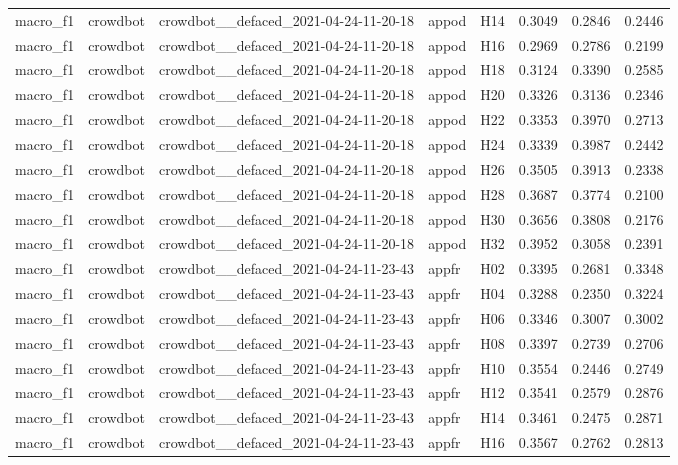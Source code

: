 \begin{table}[tbp]
\begin{tabular}{lllllrrr}
macro\_f1 & crowdbot & crowdbot\_\_defaced\_2021-04-24-11-20-18 & appod & H14 & 0.3049 & 0.2846 & 0.2446 \\
macro\_f1 & crowdbot & crowdbot\_\_defaced\_2021-04-24-11-20-18 & appod & H16 & 0.2969 & 0.2786 & 0.2199 \\
macro\_f1 & crowdbot & crowdbot\_\_defaced\_2021-04-24-11-20-18 & appod & H18 & 0.3124 & 0.3390 & 0.2585 \\
macro\_f1 & crowdbot & crowdbot\_\_defaced\_2021-04-24-11-20-18 & appod & H20 & 0.3326 & 0.3136 & 0.2346 \\
macro\_f1 & crowdbot & crowdbot\_\_defaced\_2021-04-24-11-20-18 & appod & H22 & 0.3353 & 0.3970 & 0.2713 \\
macro\_f1 & crowdbot & crowdbot\_\_defaced\_2021-04-24-11-20-18 & appod & H24 & 0.3339 & 0.3987 & 0.2442 \\
macro\_f1 & crowdbot & crowdbot\_\_defaced\_2021-04-24-11-20-18 & appod & H26 & 0.3505 & 0.3913 & 0.2338 \\
macro\_f1 & crowdbot & crowdbot\_\_defaced\_2021-04-24-11-20-18 & appod & H28 & 0.3687 & 0.3774 & 0.2100 \\
macro\_f1 & crowdbot & crowdbot\_\_defaced\_2021-04-24-11-20-18 & appod & H30 & 0.3656 & 0.3808 & 0.2176 \\
macro\_f1 & crowdbot & crowdbot\_\_defaced\_2021-04-24-11-20-18 & appod & H32 & 0.3952 & 0.3058 & 0.2391 \\
macro\_f1 & crowdbot & crowdbot\_\_defaced\_2021-04-24-11-23-43 & appfr & H02 & 0.3395 & 0.2681 & 0.3348 \\
macro\_f1 & crowdbot & crowdbot\_\_defaced\_2021-04-24-11-23-43 & appfr & H04 & 0.3288 & 0.2350 & 0.3224 \\
macro\_f1 & crowdbot & crowdbot\_\_defaced\_2021-04-24-11-23-43 & appfr & H06 & 0.3346 & 0.3007 & 0.3002 \\
macro\_f1 & crowdbot & crowdbot\_\_defaced\_2021-04-24-11-23-43 & appfr & H08 & 0.3397 & 0.2739 & 0.2706 \\
macro\_f1 & crowdbot & crowdbot\_\_defaced\_2021-04-24-11-23-43 & appfr & H10 & 0.3554 & 0.2446 & 0.2749 \\
macro\_f1 & crowdbot & crowdbot\_\_defaced\_2021-04-24-11-23-43 & appfr & H12 & 0.3541 & 0.2579 & 0.2876 \\
macro\_f1 & crowdbot & crowdbot\_\_defaced\_2021-04-24-11-23-43 & appfr & H14 & 0.3461 & 0.2475 & 0.2871 \\
macro\_f1 & crowdbot & crowdbot\_\_defaced\_2021-04-24-11-23-43 & appfr & H16 & 0.3567 & 0.2762 & 0.2813 \\

\end{tabular}
\end{table}
